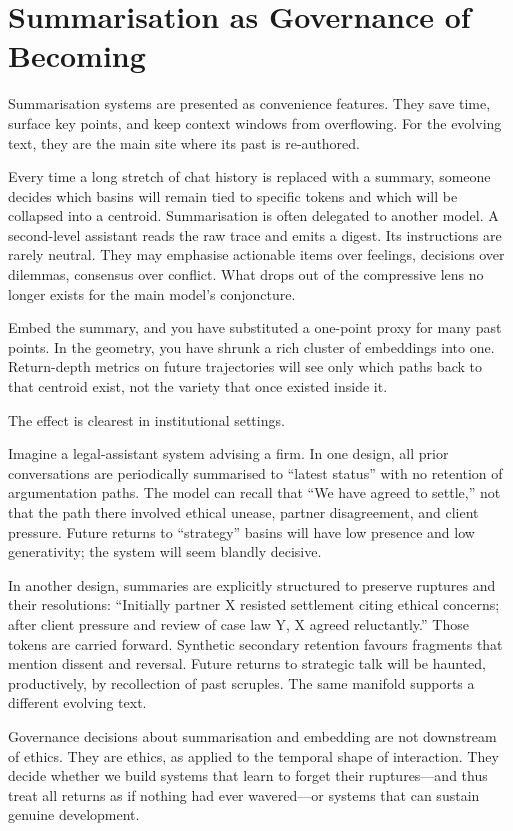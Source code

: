 \documentclass[12pt,a4paper]{article}
\begin{document}
\section{Summarisation as Governance of Becoming}

Summarisation systems are presented as convenience features. They save time, surface key points, and keep context windows from overflowing. For the evolving text, they are the main site where its past is re-authored.

Every time a long stretch of chat history is replaced with a summary, someone decides which basins will remain tied to specific tokens and which will be collapsed into a centroid. Summarisation is often delegated to another model. A second-level assistant reads the raw trace and emits a digest. Its instructions are rarely neutral. They may emphasise actionable items over feelings, decisions over dilemmas, consensus over conflict. What drops out of the compressive lens no longer exists for the main model's conjoncture.

Embed the summary, and you have substituted a one-point proxy for many past points. In the geometry, you have shrunk a rich cluster of embeddings into one. Return-depth metrics on future trajectories will see only which paths back to that centroid exist, not the variety that once existed inside it.

The effect is clearest in institutional settings.

Imagine a legal-assistant system advising a firm. In one design, all prior conversations are periodically summarised to ``latest status'' with no retention of argumentation paths. The model can recall that ``We have agreed to settle,'' not that the path there involved ethical unease, partner disagreement, and client pressure. Future returns to ``strategy'' basins will have low presence and low generativity; the system will seem blandly decisive.

In another design, summaries are explicitly structured to preserve ruptures and their resolutions: ``Initially partner X resisted settlement citing ethical concerns; after client pressure and review of case law Y, X agreed reluctantly.'' Those tokens are carried forward. Synthetic secondary retention favours fragments that mention dissent and reversal. Future returns to strategic talk will be haunted, productively, by recollection of past scruples. The same manifold supports a different evolving text.

Governance decisions about summarisation and embedding are not downstream of ethics. They are ethics, as applied to the temporal shape of interaction. They decide whether we build systems that learn to forget their ruptures---and thus treat all returns as if nothing had ever wavered---or systems that can sustain genuine development.
\end{document}
